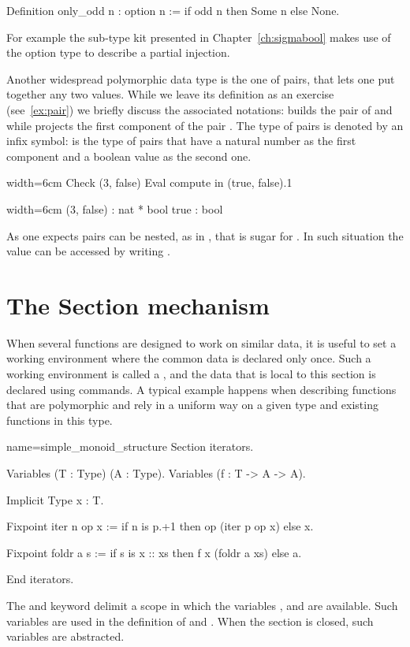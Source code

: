 \begin{coq}{}{}
Definition only_odd n : option n := if odd n then Some n else None.
\end{coq}
For example the sub-type kit presented in Chapter~\ref{ch:sigmabool} makes use
of the option type to describe a partial injection.

Another widespread polymorphic data type is the one of pairs, that
lets one put together any two values.  While we leave its definition
as an exercise (see~\ref{ex:pair}) we briefly discuss the associated
notations:  builds the pair of  and  while 
projects the first component of the pair .  The type of pairs is
denoted by an infix \C{*} symbol:  is the type of
pairs that have a natural number as the first component and a boolean
value as the second one.

\begin{coq}{}{width=6cm}
Check (3, false)
Eval compute in (true, false).1
\end{coq}
\begin{coqout}{}{width=6cm}
(3, false) : nat * bool
true : bool
\end{coqout}
As one expects pairs can be nested, as in , that is sugar
for .  In such situation the value  can be
accessed by writing .

\section{The Section mechanism}
When several functions are designed to work on similar data, it is
useful to set a working environment where the common data is declared
only once.  Such a working environment is called a , and
the data that is local to this section is declared using 
commands.  A typical example happens when describing functions that
are polymorphic and rely in a uniform way on a given type and existing
functions in this type.

\begin{coq}{name=simple_monoid_structure}{}
Section iterators.

Variables (T : Type) (A : Type).
Variables (f : T -> A -> A).

Implicit Type x : T.

Fixpoint iter n op x :=
  if n is p.+1 then op (iter p op x) else x.

Fixpoint foldr a s :=
  if s is x :: xs then f x (foldr a xs) else a.

End iterators.
\end{coq}
The  and  keyword delimit a scope in which
the variables ,  and  are available.  Such variables
are used in the definition of  and .  When the section is
closed, such variables are abstracted.

